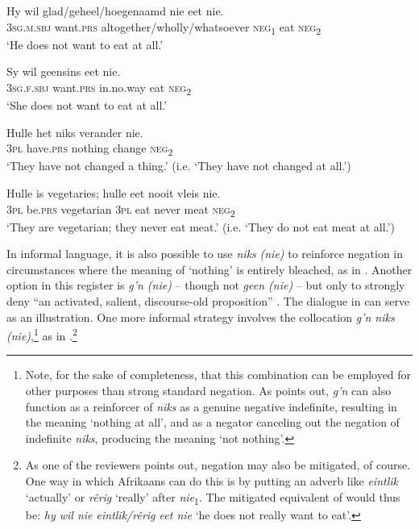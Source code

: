 \documentclass[output=paper,colorlinks,citecolor=brown]{langscibook}
\begin{document}
\ea\label{ex:afr:44}
    \ea\label{ex:afr:44a}
        \gll Hy wil glad/geheel/hoegenaamd nie eet nie. \\ 
             \textsc{3sg.m.sbj} want.\textsc{prs} altogether/wholly/whatsoever \textsc{neg}\textsubscript{1} eat \textsc{neg}\textsubscript{2} \\
        \glt ‘He does not want to eat at all.’
    
    \ex\label{ex:afr:44b}
        \gll Sy wil geensins eet nie. \\
             3\textsc{sg.f.sbj} want.\textsc{prs} in.no.way  eat \textsc{neg}\textsubscript{2} \\
        \glt ‘She does not want to eat at all.’
        
    \ex\label{ex:afr:44c}
        \gll Hulle het niks verander nie. \\ 
             3\textsc{pl} have.\textsc{prs} nothing  change \textsc{neg}\textsubscript{2} \\
        \glt ‘They have not changed a thing.’ (i.e. ‘They have not changed at all.’)
    
    \ex\label{ex:afr:44d}
        \gll Hulle is vegetaries; hulle eet nooit vleis nie. \\
             3\textsc{pl} be.\textsc{prs} vegetarian \textsc{3pl} eat never meat  \textsc{neg}\textsubscript{2} \\
        \glt ‘They are vegetarian; they never eat meat.’ (i.e. ‘They do not eat meat at all.’)
    \z
\z 

In informal language, it is also possible to use \textit{niks} \textit{(nie)} to reinforce negation in circumstances where the meaning of ‘nothing’ is entirely bleached, as in . Another option in this register is \textit{g’n (nie)} – though not \textit{geen (nie)} – but only to strongly deny “an activated, salient, discourse-old proposition” \citep[3]{Huddlestone2010}. The dialogue in  can serve as an illustration. One more informal strategy involves the collocation \textit{g’n niks (nie)},\footnote{Note, for the sake of completeness, that this combination can be employed for other purposes than strong standard negation. As \citet[265, 269]{Huddlestone2010} points out, \textit{g’n} can also function as a reinforcer of \textit{niks} as a genuine negative indefinite, resulting in the meaning ‘nothing at all’, and as a negator canceling out the negation of indefinite \textit{niks}, producing the meaning ‘not nothing’.} as in .\footnote{As one of the reviewers points out, negation may also be mitigated, of course. One way in which Afrikaans can do this is by putting an adverb like \textit{eintlik} ‘actually’ or \textit{rêrig} ‘really’ after \textit{nie}\textsubscript{1}. The mitigated equivalent of  would thus be: \textit{hy wil nie eintlik/rêrig eet nie} ‘he does not really want to eat’.}
\end{document}
